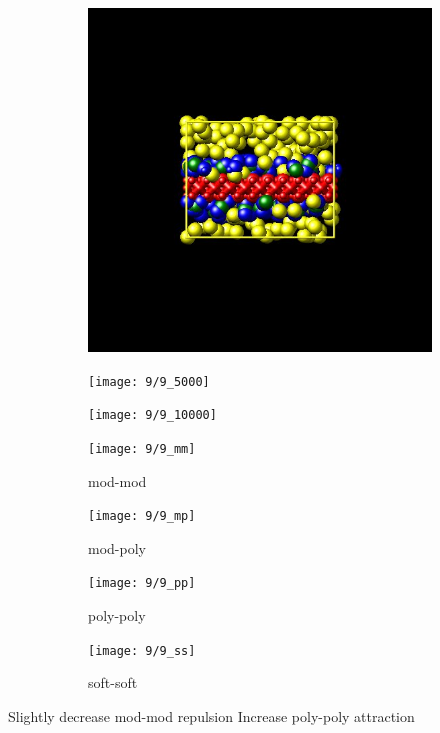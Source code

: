 \documentclass[a4paper]{article}
\begin{document}
\begin{figure}[H]
\begin{subfigure}{0.3\textwidth}
  \centering
  \includegraphics[width=\linewidth,keepaspectratio]{start}
  \caption{}
\end{subfigure}
\begin{subfigure}{0.3\textwidth}
  \centering
  \texttt{[image: 9/9\_5000]}
  \caption{}
\end{subfigure}
\begin{subfigure}{0.3\textwidth}
  \centering
  \texttt{[image: 9/9\_10000]}
  \caption{}
\end{subfigure}
\caption{}
\label{fig_1}
\end{figure}

\begin{figure}[H]
\begin{subfigure}{0.24\textwidth}
  \centering
  \texttt{[image: 9/9\_mm]}
  \caption{mod-mod}
\end{subfigure}
\begin{subfigure}{0.24\textwidth}
  \centering
  \texttt{[image: 9/9\_mp]}
  \caption{mod-poly}
\end{subfigure}
\begin{subfigure}{0.24\textwidth}
  \centering
  \texttt{[image: 9/9\_pp]}
  \caption{poly-poly}
\end{subfigure}
\begin{subfigure}{0.24\textwidth}
  \centering
  \texttt{[image: 9/9\_ss]}
  \caption{soft-soft}
\end{subfigure}
\caption{}
\label{fig_1}
\end{figure}
Slightly decrease mod-mod repulsion\newline
Increase poly-poly attraction
\end{document}
